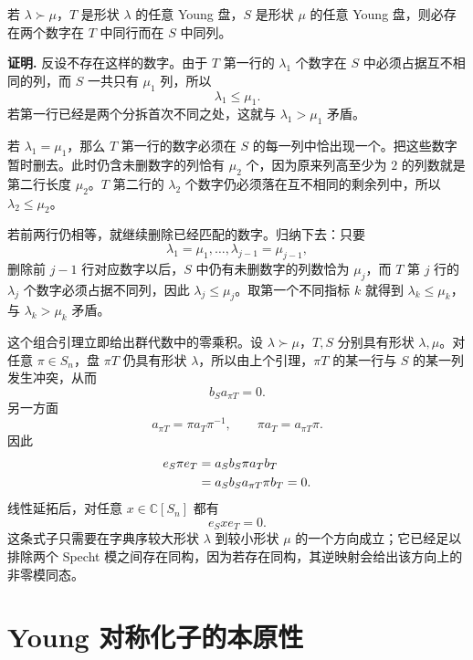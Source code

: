 \begin{lemma}[不同形状必产生行列冲突]
若 $\lambda\succ\mu$，$T$ 是形状 $\lambda$ 的任意 Young 盘，$S$ 是形状 $\mu$ 的任意 Young 盘，则必存在两个数字在 $T$ 中同行而在 $S$ 中同列。

\par\smallskip\noindent\textbf{证明.}
反设不存在这样的数字。由于 $T$ 第一行的 $\lambda_1$ 个数字在 $S$ 中必须占据互不相同的列，而 $S$ 一共只有 $\mu_1$ 列，所以
\[
\lambda_1\le\mu_1.
\]
若第一行已经是两个分拆首次不同之处，这就与 $\lambda_1>\mu_1$ 矛盾。

若 $\lambda_1=\mu_1$，那么 $T$ 第一行的数字必须在 $S$ 的每一列中恰出现一个。把这些数字暂时删去。此时仍含未删数字的列恰有 $\mu_2$ 个，因为原来列高至少为 $2$ 的列数就是第二行长度 $\mu_2$。$T$ 第二行的 $\lambda_2$ 个数字仍必须落在互不相同的剩余列中，所以 $\lambda_2\le\mu_2$。

若前两行仍相等，就继续删除已经匹配的数字。归纳下去：只要
\[
\lambda_1=\mu_1,\dots,\lambda_{j-1}=\mu_{j-1},
\]
删除前 $j-1$ 行对应数字以后，$S$ 中仍有未删数字的列数恰为 $\mu_j$，而 $T$ 第 $j$ 行的 $\lambda_j$ 个数字必须占据不同列，因此 $\lambda_j\le\mu_j$。取第一个不同指标 $k$ 就得到 $\lambda_k\le\mu_k$，与 $\lambda_k>\mu_k$ 矛盾。
\end{lemma}

这个组合引理立即给出群代数中的零乘积。设 $\lambda\succ\mu$，$T,S$ 分别具有形状 $\lambda,\mu$。对任意 $\pi\in S_n$，盘 $\pi T$ 仍具有形状 $\lambda$，所以由上个引理，$\pi T$ 的某一行与 $S$ 的某一列发生冲突，从而
\[
b_Sa_{\pi T}=0.
\]
另一方面
\[
a_{\pi T}=\pi a_T\pi^{-1},
\qquad
\pi a_T=a_{\pi T}\pi.
\]
因此
\begin{align}
e_S\pi e_T
&=a_Sb_S\pi a_Tb_T\notag\\
&=a_Sb_Sa_{\pi T}\pi b_T=0.
\label{eq:different-shape-zero}
\end{align}
线性延拓后，对任意 $x\in\mathbb C[S_n]$ 都有
\[
e_Sxe_T=0.
\]
这条式子只需要在字典序较大形状 $\lambda$ 到较小形状 $\mu$ 的一个方向成立；它已经足以排除两个 Specht 模之间存在同构，因为若存在同构，其逆映射会给出该方向上的非零模同态。

\section{\texorpdfstring{Young 对称化子的本原性}{Young 对称化子的本原性}}

